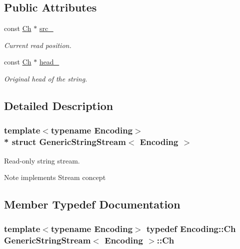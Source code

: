 \subsection*{Public Attributes}
\begin{DoxyCompactItemize}
\item 
const \hyperlink{structGenericStringStream_a4289aca895330084ff3168e37e4f08bd}{Ch} $\ast$ \hyperlink{structGenericStringStream_aeda813798e3f2d6bfdac86afc11b6b80}{src\+\_\+}
\begin{DoxyCompactList}\small\item\em Current read position. \end{DoxyCompactList}\item 
const \hyperlink{structGenericStringStream_a4289aca895330084ff3168e37e4f08bd}{Ch} $\ast$ \hyperlink{structGenericStringStream_a3c86ef1e1f0655028cb8a3afce11ee4f}{head\+\_\+}
\begin{DoxyCompactList}\small\item\em Original head of the string. \end{DoxyCompactList}\end{DoxyCompactItemize}


\subsection{Detailed Description}
\subsubsection*{template$<$typename Encoding$>$\\*
struct Generic\+String\+Stream$<$ Encoding $>$}

Read-\/only string stream. 

\begin{DoxyNote}{Note}
implements Stream concept 
\end{DoxyNote}


\subsection{Member Typedef Documentation}
\subsubsection[{\texorpdfstring{Ch}{Ch}}]{\setlength{\rightskip}{0pt plus 5cm}template$<$typename Encoding$>$ typedef Encoding\+::\+Ch {\bf Generic\+String\+Stream}$<$ Encoding $>$\+::{\bf Ch}}\hypertarget{structGenericStringStream_a4289aca895330084ff3168e37e4f08bd}{}\label{structGenericStringStream_a4289aca895330084ff3168e37e4f08bd}


